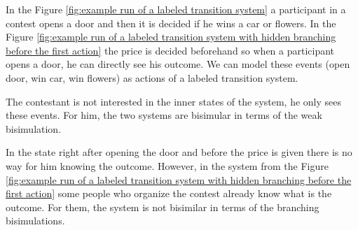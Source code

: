\begin{example}
  In the Figure \ref{fig:example run of a labeled transition system} a participant in a contest opens a door and then it is decided if he wins a car or flowers. In the Figure \ref{fig:example run of a labeled transition system with hidden branching before the first action} the price is decided beforehand so when a participant opens a door, he can directly see his outcome. We can model these events (open door, win car, win flowers) as actions of a labeled transition system.

  The contestant is not interested in the inner states of the system, he only sees these events. For him, the two systems are bisimular in terms of the weak bisimulation.

  In the state right after opening the door and before the price is given there is no way for him knowing the outcome. However, in the system from the Figure \ref{fig:example run of a labeled transition system with hidden branching before the first action} some people who organize the contest already know what is the outcome. For them, the system is not bisimilar in terms of the branching bisimulations.
\end{example}